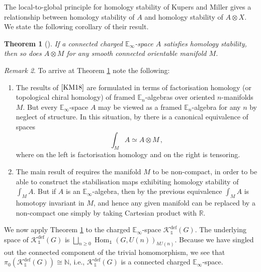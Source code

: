 \documentclass[oneside, a4paper, 12pt]{article}
\numberwithin{equation}{section}
\DeclareMathOperator{\Hom}{Hom}
\newcommand{\Kdef}{\mathcal{K}^{\mathrm{def}}}
\newcommand{\R}{\mathbb{R}}
\newcommand{\N}{\mathbb{N}}
\theoremstyle{plain}
\newtheorem{theorem}{Theorem}[section]
\theoremstyle{definition}
\theoremstyle{remark}
\newtheorem{remark}[theorem]{Remark}
\begin{document}
The local-to-global principle for homology stability of Kupers and Miller \cite{KM18} gives a relationship between homology stability of $A$ and homology stability of $A\otimes X$. We state the following corollary of their result.

\begin{theorem}[\cite{KM18}] \label{thm:localtoglobal}
If a connected charged $\mathbb{E}_\infty$-space $A$ satisfies homology stability, then so does $A\otimes M$ for any smooth connected orientable manifold $M$.
\end{theorem}

\begin{remark} To arrive at Theorem \ref{thm:localtoglobal} note the following:
\begin{enumerate}
\item[(1)] The results of $\cite{KM18}$ are formulated in terms of factorisation homology (or topological chiral homology) of framed $\mathbb{E}_n$-algebras over oriented $n$-manifolds $M$. But every $\mathbb{E}_\infty$-space $A$ may be viewed as a framed $\mathbb{E}_n$-algebra for any $n$ by neglect of structure. In this situation, by \cite[Proposition 5.1]{AF1} there is a canonical equivalence of spaces
\begin{equation*} \label{eq:fh}
\int_M A \simeq A \otimes M\,,
\end{equation*}
where on the left is factorisation homology and on the right is tensoring.
\item[(2)] The main result of \cite{KM18} requires the manifold $M$ to be non-compact, in order to be able to construct the stabilisation maps exhibiting homology stability of $\int_M A$. But if $A$ is an $\mathbb{E}_\infty$-algebra, then by the previous equivalence $\int_M A$ is homotopy invariant in $M$, and hence any given manifold can be replaced by a non-compact one simply by taking Cartesian product with $\R$.
\end{enumerate}
\end{remark}


We now apply Theorem \ref{thm:localtoglobal} to the charged $\mathbb{E}_\infty$-space $\Kdef_{\mathds{1}}(G)$. The underlying space of $\Kdef_{\mathds{1}}(G)$ is $\bigsqcup_{n\geq 0} \Hom_{\mathds{1}}(G,U(n))_{hU(n)}$. Because we have singled out the connected component of the trivial homomorphism, we see that $\pi_0(\Kdef_{\mathds{1}}(G))\cong \N$, i.e., $\Kdef_{\mathds{1}}(G)$ is a connected charged $\mathbb{E}_\infty$-space.
\end{document}
